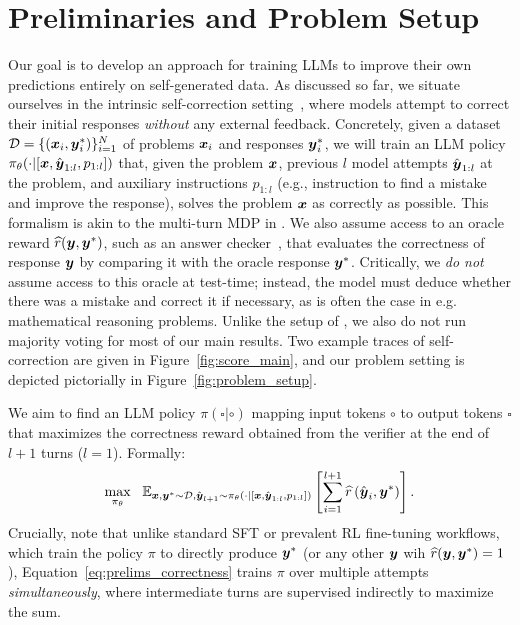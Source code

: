 \vspace{-0.2cm}
\section{Preliminaries and Problem Setup}
\label{sec:prelim}
\vspace{-0.2cm}

Our goal is to develop an approach for training LLMs to improve their own predictions entirely on self-generated data. As discussed so far, we situate ourselves in the intrinsic self-correction setting~\citep{huang2023large}, where models attempt to correct their initial responses \emph{without} any external feedback. Concretely, given a dataset $\mathcal{D} = \{(\boldsymbol{x}_i, \boldsymbol{y}^*_i) \}_{i=1}^N$ of problems $\boldsymbol{x}_i$ and responses $\boldsymbol{y}^*_i$, we will train an LLM policy $\pi_\theta(\cdot|[\boldsymbol{x}, \hat{\boldsymbol{y}}_{1:l}, p_{1:l}])$ that, given the problem $\boldsymbol{x}$, previous $l$ model attempts $\hat{\boldsymbol{y}}_{1:l}$ at the problem, and auxiliary instructions $p_{1:l}$ (e.g., instruction to find a mistake and improve the response), solves the problem $\boldsymbol{x}$ as correctly as possible. This formalism is akin to the multi-turn MDP in \citet{qu2024recursive}. We also assume access to an oracle reward $\widehat{r}(\boldsymbol{y}, \boldsymbol{y}^*)$, such as an answer checker~\citep{uesato2022solving}, that evaluates the correctness of response $\boldsymbol{y}$ by comparing it with the oracle response $\boldsymbol{y}^*$. Critically, we \emph{do not} assume access to this oracle at test-time; instead, the model must deduce whether there was a mistake and correct it if necessary, as is often the case in e.g. mathematical reasoning problems. Unlike the setup of \citet{qu2024recursive}, we also do not run majority voting for most of our main results. Two example traces of self-correction are given in Figure~\ref{fig:score_main}, and our problem setting is depicted pictorially in Figure~\ref{fig:problem_setup}.

We aim to find an LLM policy $\pi(\square|\circ)$ mapping input tokens $\circ$ to output tokens $\square$ that maximizes the correctness reward obtained from the verifier at the end of $l+1$ turns ($l = 1$). Formally:
\begin{align}
\label{eq:prelims_correctness}
    \max_{\pi_\theta}~~ \mathbb{E}_{\boldsymbol{x}, \boldsymbol{y}^* \sim \mathcal{D}, \hat{\boldsymbol{y}}_{l+1} \sim \pi_\theta \left(\cdot|[\boldsymbol{x}, \hat{\boldsymbol{y}}_{1:l}, p_{1:l}]\right)} \left[ \sum_{i=1}^{l+1} \widehat{r} \left( \hat{\boldsymbol{y}}_{i}, \boldsymbol{y}^* \right) \right].
\end{align}
Crucially, note that unlike standard SFT or prevalent RL fine-tuning workflows, which train the policy $\pi$ to directly produce $\boldsymbol{y}^*$ (or any other $\boldsymbol{y}$ wih $\widehat{r}(\boldsymbol{y}, \boldsymbol{y}^*) = 1$), Equation~\ref{eq:prelims_correctness} trains $\pi$ over multiple attempts \emph{simultaneously}, where intermediate turns are supervised indirectly to maximize the sum. 

